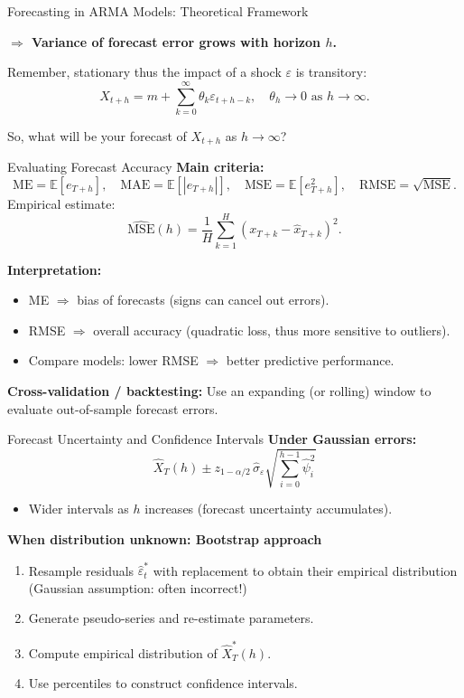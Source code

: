 \documentclass{beamer}
\begin{document}
\begin{frame}{Forecasting in ARMA Models: Theoretical Framework}
\small

\textbf{$\Longrightarrow$ Variance of forecast error grows with horizon $h$.}

Remember, stationary thus the impact of a shock $\varepsilon$ is transitory:
    \[
        X_{t+h} = m + \sum_{k=0}^{\infty} \theta_k \varepsilon_{t+h-k}, 
        \quad \theta_h \to 0 \text{ as } h \to \infty.
    \]

So, what will be your forecast of $X_{t+h}$ as $h\to \infty$?
\end{frame}




\begin{frame}{Evaluating Forecast Accuracy}
\small
\textbf{Main criteria:}
\[
\text{ME} = \mathbb{E}[e_{T+h}], \quad
\text{MAE} = \mathbb{E}[|e_{T+h}|], \quad
\text{MSE} = \mathbb{E}[e_{T+h}^2], \quad
\text{RMSE} = \sqrt{\text{MSE}}.
\]
Empirical estimate:
\[
\widehat{\text{MSE}}(h) = \frac{1}{H}\sum_{k=1}^{H} (x_{T+k} - \hat{x}_{T+k})^2.
\]

\pause
\textbf{Interpretation:}
\begin{itemize}
    \item ME $\Rightarrow$ bias of forecasts (signs can cancel out errors).
    \item RMSE $\Rightarrow$ overall accuracy (quadratic loss, thus more sensitive to outliers).
    \item Compare models: lower RMSE $\Rightarrow$ better predictive performance.
\end{itemize}

\pause
\textbf{Cross-validation / backtesting:}
Use an expanding (or rolling) window to evaluate out-of-sample forecast errors.
\end{frame}


\begin{frame}{Forecast Uncertainty and Confidence Intervals}
\small
\textbf{Under Gaussian errors:}
\[
\hat{X}_T(h) \pm z_{1-\alpha/2}\,\hat{\sigma}_\varepsilon
\sqrt{\sum_{i=0}^{h-1} \hat{\psi}_i^2}
\]
\begin{itemize}
  \item Wider intervals as $h$ increases (forecast uncertainty accumulates).

\end{itemize}

\pause
\textbf{When distribution unknown: Bootstrap approach}
\begin{enumerate}
  \item Resample residuals $\hat{\varepsilon}_t^*$ with replacement to obtain their empirical distribution (Gaussian assumption: often incorrect!)
  \item Generate pseudo-series and re-estimate parameters.
  \item Compute empirical distribution of $\hat{X}_T^*(h)$.
  \item Use percentiles to construct confidence intervals.
\end{enumerate}
\end{frame}
\end{document}
